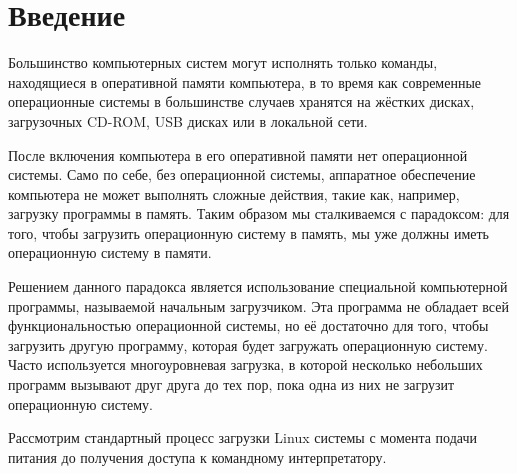 \newpage
\section*{Введение}

Большинство компьютерных систем могут исполнять только команды, находящиеся в оперативной памяти компьютера, в то время как современные операционные системы в большинстве случаев хранятся на жёстких дисках, загрузочных CD-ROM, USB дисках или в локальной сети.

После включения компьютера в его оперативной памяти нет операционной системы. Само по себе, без операционной системы, аппаратное обеспечение компьютера не может выполнять сложные действия, такие как, например, загрузку программы в память. Таким образом мы сталкиваемся с парадоксом: для того, чтобы загрузить операционную систему в память, мы уже должны иметь операционную систему в памяти.

Решением данного парадокса является использование специальной компьютерной программы, называемой начальным загрузчиком. Эта программа не обладает всей функциональностью операционной системы, но её достаточно для того, чтобы загрузить другую программу, которая будет загружать операционную систему. Часто используется многоуровневая загрузка, в которой несколько небольших программ вызывают друг друга до тех пор, пока одна из них не загрузит операционную систему.

Рассмотрим стандартный процесс загрузки Linux системы с момента подачи питания до получения доступа к командному интерпретатору.